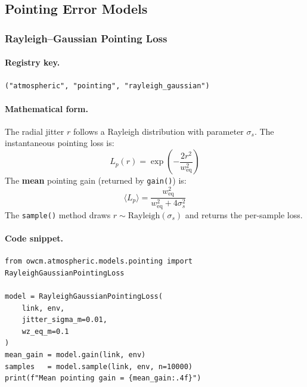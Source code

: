 \documentclass[11pt,a4paper]{article}
\begin{document}
\subsection{Pointing Error Models}

\subsubsection{Rayleigh--Gaussian Pointing Loss}
\label{sec:rayleigh_gaussian}

\paragraph{Registry key.} \texttt{("atmospheric", "pointing", "rayleigh\_gaussian")}

\paragraph{Mathematical form.}
The radial jitter $r$ follows a Rayleigh distribution with parameter
$\sigma_s$.  The instantaneous pointing loss is:
\begin{equation}
L_p(r) = \exp\!\left(-\frac{2r^2}{w_{\text{eq}}^2}\right)
\end{equation}
The \textbf{mean} pointing gain (returned by \texttt{gain()}) is:
\begin{equation}
\boxed{\langle L_p \rangle = \frac{w_{\text{eq}}^2}{w_{\text{eq}}^2 + 4\sigma_s^2}}
\end{equation}
The \texttt{sample()} method draws $r \sim \mathrm{Rayleigh}(\sigma_s)$ and
returns the per-sample loss.

\paragraph{Code snippet.}
\begin{lstlisting}
from owcm.atmospheric.models.pointing import RayleighGaussianPointingLoss

model = RayleighGaussianPointingLoss(
    link, env,
    jitter_sigma_m=0.01,
    wz_eq_m=0.1
)
mean_gain = model.gain(link, env)
samples   = model.sample(link, env, n=10000)
print(f"Mean pointing gain = {mean_gain:.4f}")
\end{lstlisting}

\end{document}
